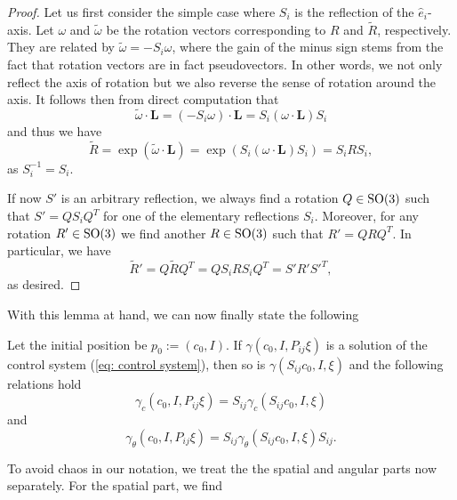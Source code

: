 \begin{proof}
Let us first consider the simple case where $S_i$ is the reflection of the $\hat{e}_i$-axis. Let $\omega$ and $\tilde{\omega}$ be the rotation vectors corresponding to $R$ and $\tilde{R}$, respectively. They are related by $\tilde{\omega} = -S_i \omega$, where the gain of the minus sign stems from the fact that rotation vectors are in fact pseudovectors. In other words, we not only reflect the axis of rotation but we also reverse the sense of rotation around the axis. It follows then from direct computation that
\begin{equation}
\label{eq: transformation of rotation axis}
 \tilde{\omega} \cdot \mathbf{L} = (-S_i\omega) \cdot \mathbf{L} = S_i(\omega \cdot \mathbf{L})S_i
\end{equation}
and thus we have
\begin{equation}
\tilde{R} = \exp(\tilde{\omega} \cdot \mathbf{L}) = \exp(S_i(\omega \cdot \mathbf{L})S_i) = S_iRS_i,
\end{equation}
as $S_i^{-1} = S_i$.

If now $S'$ is an arbitrary reflection, we always find a rotation $Q \in \operatorname{SO}(3)$ such that $S' = Q S_i Q^T$ for one of the elementary reflections $S_i$. Moreover, for any rotation $R' \in \operatorname{SO}(3)$ we find another $R \in \operatorname{SO}(3)$ such that $R' = Q R Q^T$. In particular, we have
\begin{equation}
\tilde{R}' = Q \tilde{R} Q^T = Q S_iRS_i Q^T = S' R' S'^T,
\end{equation}
as desired.
\end{proof}

With this lemma at hand, we can now finally state the following

\begin{condition}
\label{cond:swap}
Let the initial position be $p_0 := (c_0, I)$. If $\gamma(c_0, I, P_{ij} \xi)$ is a solution of the control system (\ref{eq: control system}), then so is $\gamma(S_{ij}c_0, I, \xi)$ and the following relations hold
\begin{equation}
	\gamma_c(c_0, I, P_{ij} \xi) = S_{ij} \gamma_c(S_{ij}c_0, I, \xi)
\end{equation}
and
\begin{equation}
	\gamma_{\theta}(c_0, I, P_{ij} \xi ) = S_{ij} \gamma_{\theta} (S_{ij} c_0, I, \xi) S_{ij}.
\end{equation}
\end{condition}
To avoid chaos in our notation, we treat the the spatial and angular parts now separately. For the spatial part, we find


